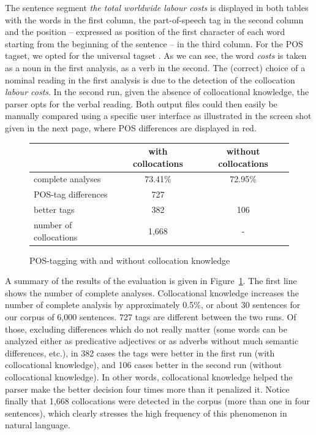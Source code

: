 \documentclass[output=paper]{langsci/langscibook}
\begin{document}
 
 

The sentence segment \textit{the total worldwide labour costs} is displayed in both tables with the words in the first column, the part-of-speech tag in the second column and the position – expressed as position of the first character of each word starting from the beginning of the sentence – in the third column.  For the POS tagset, we opted for the universal tagset \citep{petrov12}. As we can see, the word \textit{costs} is taken as a noun in the first analysis, as a verb in the second. The (correct) choice of a nominal reading in the first analysis is due to the detection of the collocation \textit{labour costs}. In the second run, given the absence of collocational knowledge, the parser opts for the verbal reading. Both output files could then easily be manually compared using a specific user interface as illustrated in the screen shot given in the next page, where POS differences are displayed in red.

\begin{figure}[h]
\begin{tabular}{lcc}
 & with collocations & without collocations \\ \hline
 complete analyses & 73.41\% & 72.95\% \\
 POS-tag differences & 727 \\
 better tags & 382 & 106\\
 number of collocations & 1,668 & -
\end{tabular}
 \caption{\label{fig9}POS-tagging with and without collocation knowledge}
\end{figure}  

A summary of the results of the evaluation is given in Figure~\ref{fig9}. The first line shows the number of complete analyses. Collocational knowledge increases the number of complete analysis by approximately 0.5\%, or about 30 sentences for our corpus of 6,000 sentences. 727 tags are different between the two runs. Of those, excluding differences which do not really matter (some words can be analyzed either as predicative adjectives or as adverbs without much semantic differences, etc.), in 382 cases the tags were better in the first run (with collocational knowledge), and 106 cases better in the second run (without collocational knowledge). In other words, collocational knowledge helped the parser make the better decision four times more than it penalized it. Notice finally that 1,668 collocations were detected in the corpus (more than one in four sentences), which clearly stresses the high frequency of this phenomenon in natural language.
\end{document}

